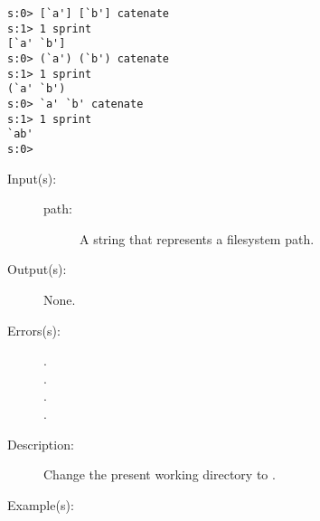 \begin{description}
\begin{description}
\begin{verbatim}
s:0> [`a'] [`b'] catenate
s:1> 1 sprint
[`a' `b']
s:0> (`a') (`b') catenate
s:1> 1 sprint
(`a' `b')
s:0> `a' `b' catenate
s:1> 1 sprint
`ab'
s:0>
		\end{verbatim}
	\end{description}
\label{systemdict:cd}
\item[{\onyxop{path}{cd}{--}}: ]
	\begin{description}\item[]
	\item[Input(s): ]
		\begin{description}\item[]
		\item[path: ]
			A string that represents a filesystem path.
		\end{description}
	\item[Output(s): ] None.
	\item[Errors(s): ]
		\begin{description}\item[]
		\item[.]
		\item[.]
		\item[.]
		\item[.]
		\end{description}
	\item[Description: ]
		Change the present working directory to .
	\item[Example(s): ]\begin{verbatim}


\end{verbatim}
\end{description}
\end{description}
